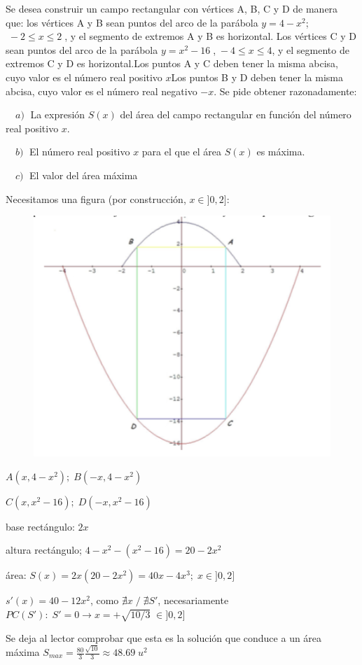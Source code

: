 	\begin{ejre} Se desea construir un campo rectangular con vértices A, B, C y D de manera que: los vértices A y B sean puntos del arco de la parábola $y=4-x^2$; $\; -2\le x\le 2\; $, y el segmento de extremos A y B es horizontal. Los vértices C y D sean puntos del arco de la parábola $y=x^2-16\; $,$\; -4\le x\le 4$, y el segmento de extremos C y  D es horizontal.Los puntos A y C deben tener la misma abcisa, cuyo valor es el número real positivo $x$Los puntos B y D deben tener la misma abcisa, cuyo valor es el número real negativo $-x$. Se pide obtener razonadamente:
 
	$\quad a) \; $ La expresión $S(x)$ del área del campo rectangular en función del número real positivo $x$. 
	
	$\quad b) \; $ El número real positivo $x$ para el que el área $S(x)$ es máxima.  
	
	$\quad c) \;$ El valor del área máxima	
	
	\end{ejre}

	\begin{proofw}\renewcommand{\qedsymbol}{$\diamond$}
	
	
	Necesitamos una figura (por construcción, $x \in ]0,2]$:
	\begin{multicols}{2}
	
	
	\begin{figure}[H]
	\centering
	\includegraphics[width=.4\textwidth]{imagenes/imagenes05/T05IM24.png}
	\end{figure}
	 $A(x, 4-x^2); \; B(-x, 4-x^2)$
	 
	 $C(x,x^2-16); \; D(-x, x^2-16)$
	 
	 base rectángulo: $2x$
	 
	 altura rectángulo; $4-x^2-(x^2-16)=20-2x^2$
	 
	 área: $S(x)=2x(20-2x^2)=40x-4x^3; \;  x \in ]0,2]$
	 
	 $s'(x)=40-12x^2$, como $\nexists x\; / \; \nexists S'$, necesariamente $PC(S'): \; S'=0\to x=+\sqrt {10/3} \; \in ]0,2]$
	 
	\end{multicols}

	 Se deja al lector comprobar que esta es la solución que conduce a un área máxima $S_{max}=\frac {80}3	\frac {\sqrt{10}} 3 \approx 48.69\; u^2$
	\end{proofw}
	
